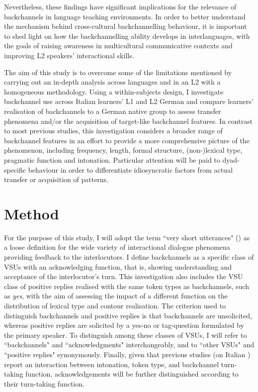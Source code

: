 Nevertheless, these findings have significant implications for the relevance of backchannels in language teaching environments. In order to better understand the mechanism behind cross-cultural backchannelling behaviour, it is important to shed light on how the backchannelling ability develops in interlanguages, with the goals of raising awareness in multicultural communicative contexts and improving L2 speakers’ interactional skills.

The aim of this study is to overcome some of the limitations mentioned by carrying out an in-depth analysis across languages and in an L2 with a homogeneous methodology. Using a within-subjects design, I investigate backchannel use across Italian learners’ L1 and L2 German and compare learners’ realisation of backchannels to a German native group to assess transfer phenomena and/or the acquisition of target-like backchannel features. In contrast to most previous studies, this investigation considers a broader range of backchannel features in an effort to provide a more comprehensive picture of the phenomenon, including frequency, length, formal structure, (non-)lexical type, pragmatic function and intonation. Particular attention will be paid to dyad-specific behaviour in order to differentiate idiosyncratic factors from actual transfer or acquisition of patterns.

\section{Method}
\label{sec:4.2}
For the purpose of this study, I will adopt the term ``very short utterances" (\citealt{EdlundEtAl2010}) as a loose definition for the wide variety of interactional dialogue phenomena providing feedback to the interlocutors. I define backchannels as a specific class of VSUs with an acknowledging function, that is, showing understanding and acceptance of the interlocutor’s turn. This investigation also includes the VSU class of positive replies realised with the same token types as backchannels, such as \textit{yes}, with the aim of assessing the impact of a different function on the distribution of lexical type and contour realisation. The criterion used to distinguish backchannels and positive replies is that backchannels are unsolicited, whereas positive replies are solicited by a yes-no or tag-question formulated by the primary speaker. To distinguish among these classes of VSUs, I will refer to ``backchannels" and ``acknowledgments" interchangeably, and to ``other VSUs" and ``positive replies" synonymously. Finally, given that previous studies (on Italian \citealt{Savino2010, Savino2011, Savino2014}) report an interaction between intonation, token type, and backchannel turn-taking function, acknowledgements will be further distinguished according to their turn-taking function.

